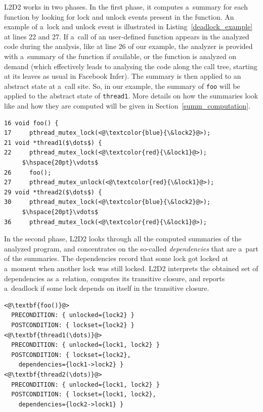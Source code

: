 \documentclass{ExcelAtFIT}
\renewcommand\vdots{%
  \vbox{\baselineskip3pt\lineskiplimit0pt\kern1pt\hbox{.}\hbox{.}\hbox{.}\kern-1pt}}
\begin{document}
L2D2 works in two phases. In the first phase, it computes a~summary for each function by looking for lock and unlock events present in the function. An example of a~lock and unlock event is illustrated in Listing~\ref{deadlock_example} at lines 22 and 27. If a~call of an user-defined function appears in the analyzed code during the analysis, like at line 26 of our example, the analyzer is provided with a~summary of the function if available, or the function is analyzed on demand (which effectively leads to analysing the code along the call tree, starting at its leaves as usual in Facebook Infer). The summary is then applied to an abstract state at a~call site. So, in our example, the summary of \texttt{foo} will be applied to the abstract state of \texttt{thread1}. More details on how the summaries look like and how they are computed will be given in Section~\ref{summ_computation}.
\begin{lstlisting}[float=tp, belowskip=-1.5 \baselineskip, caption= A~simple example capturing a~deadlock between two global locks in the C~language using the POSIX threads execution model.,
label={deadlock_example}, mathescape=true]
16 void foo() {
17     pthread_mutex_lock(<@\textcolor{blue}{\&lock2}@>);
21 void *thread1($\dots$) {
22     pthread_mutex_lock(<@\textcolor{red}{\&lock1}@>);
     $\hspace{20pt}\vdots$
26     foo();
27     pthread_mutex_unlock(<@\textcolor{red}{\&lock1}@>);
29 void *thread2($\dots$) {
30     pthread_mutex_lock(<@\textcolor{blue}{\&lock2}@>);
     $\hspace{20pt}\vdots$
36     pthread_mutex_lock(<@\textcolor{red}{\&lock1}@>);
\end{lstlisting}

In the second phase, L2D2 looks through all the computed summaries of the analyzed program, and concentrates on the so-called \textit{dependencies} that are a~part of the summaries. The dependencies record that some lock got locked at a~moment when another lock was still locked. L2D2 interprets the obtained set of dependencies as a~relation, computes its transitive closure, and reports a~deadlock if some lock depends on itself in the transitive closure.
\begin{lstlisting}[float=tp, belowskip=-1.5 \baselineskip, label={deadlock_example_summary}, caption=Summaries of the functions in Listing~\ref{deadlock_example}]
<@\textbf{foo()}@>
  PRECONDITION: { unlocked={lock2} }
  POSTCONDITION: { lockset={lock2} }
<@\textbf{thread1(\dots)}@>
  PRECONDITION: { unlocked={lock1, lock2} }
  POSTCONDITION: { lockset={lock2},
    dependencies={lock1->lock2} }
<@\textbf{thread2(\dots)}@>
  PRECONDITION: { unlocked={lock1, lock2} }
  POSTCONDITION: { lockset={lock1, lock2},
    dependencies={lock2->lock1} }
\end{lstlisting}
\end{document}
